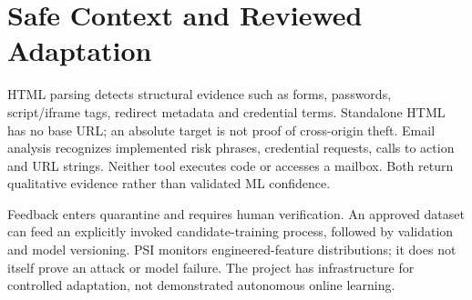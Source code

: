 \section{Safe Context and Reviewed Adaptation}
HTML parsing detects structural evidence such as forms, passwords, script/iframe tags, redirect metadata and credential terms. Standalone HTML has no base URL; an absolute target is not proof of cross-origin theft. Email analysis recognizes implemented risk phrases, credential requests, calls to action and URL strings. Neither tool executes code or accesses a mailbox. Both return qualitative evidence rather than validated ML confidence.

Feedback enters quarantine and requires human verification. An approved dataset can feed an explicitly invoked candidate-training process, followed by validation and model versioning. PSI monitors engineered-feature distributions; it does not itself prove an attack or model failure. The project has infrastructure for controlled adaptation, not demonstrated autonomous online learning.